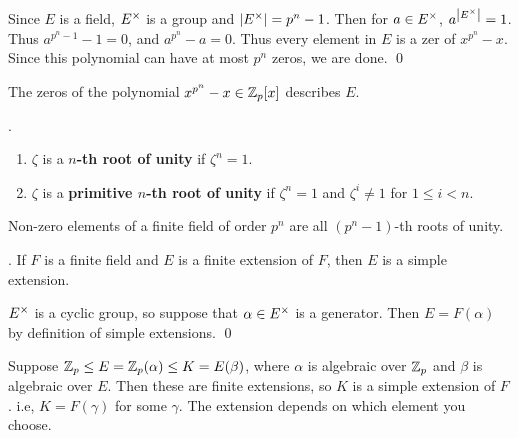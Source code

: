 \pf Since \(E\) is a field, \(E^\times\) is a group and \(\left| E^\times \right| = p^n - 1\). Then for \(a \in E^\times\), \(a^{\left| E^\times \right|} = 1\). Thus \(a^{p^n - 1} - 1 = 0\), and \(a^{p^n} - a = 0\). Thus every element in \(E\) is a zer of \(x^{p^n} - x\). Since this polynomial can have at most \(p^n\) zeros, we are done. \qed

The zeros of the polynomial \(x^{p^n} - x \in \mathbb{Z}_p[x]\) describes \(E\).

. 
\begin{enumerate}
    \item \(\zeta\) is a \textbf{\(n\)-th root of unity} if \(\zeta^n = 1\).
    \item \(\zeta\) is a \textbf{primitive \(n\)-th root of unity} if \(\zeta^n = 1\) and \(\zeta^i \neq 1\) for \(1 \leq i < n\).
\end{enumerate}

Non-zero elements of a finite field of order \(p^n\) are all \((p^n - 1)\)-th roots of unity.

\cor. If \(F\) is a finite field and \(E\) is a finite extension of \(F\), then \(E\) is a simple extension.

\pf \(E^\times\) is a cyclic group, so suppose that \(\alpha \in E^\times\) is a generator. Then \(E = F(\alpha)\) by definition of simple extensions. \qed

Suppose \(\mathbb{Z}_p \leq E = \mathbb{Z}_p(\alpha) \leq K = E(\beta)\), where \(\alpha\) is algebraic over \(\mathbb{Z}_p\) and \(\beta\) is algebraic over \(E\). Then these are finite extensions, so \(K\) is a simple extension of \(F\). i.e, \(K = F(\gamma)\) for some \(\gamma\). The extension depends on which element you choose.

\pagebreak
